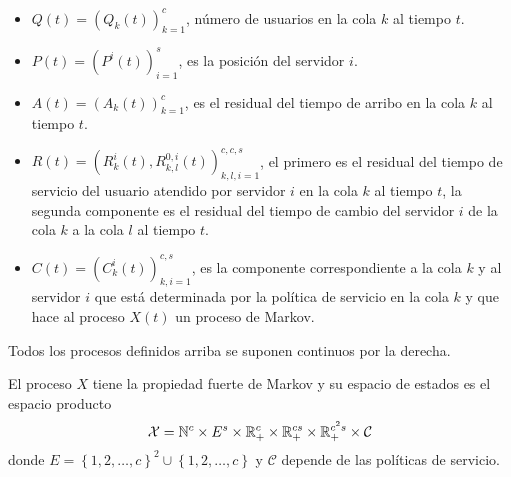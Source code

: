 \begin{itemize}
\item
$Q\left(t\right)=\left(Q_{k}\left(t\right)\right)_{k=1}^{c}$,
n\'umero de usuarios en la cola $k$ al tiempo $t$. \item
$P\left(t\right)=\left(P^{i}\left(t\right)\right)_{i=1}^{s}$, es
la posici\'on del servidor $i$. \item
$A\left(t\right)=\left(A_{k}\left(t\right)\right)_{k=1}^{c}$, es
el residual del tiempo de arribo en la cola $k$ al tiempo $t$.
\item
$R\left(t\right)=\left(R_{k}^{i}\left(t\right),R_{k,l}^{0,i}\left(t\right)\right)_{k,l,i=1}^{c,c,s}$,
el primero es el residual del tiempo de servicio del usuario
atendido por servidor $i$ en la cola $k$ al tiempo $t$, la segunda
componente es el residual del tiempo de cambio del servidor $i$ de
la cola $k$ a la cola $l$ al tiempo $t$. \item
$C\left(t\right)=\left(C_{k}^{i}\left(t\right)\right)_{k,i=1}^{c,s}$,
es la componente correspondiente a la cola $k$ y al servidor $i$
que est\'a determinada por la pol\'itica de servicio en la cola $k$
y que hace al proceso $X\left(t\right)$ un proceso de Markov.
\end{itemize}
Todos los procesos definidos arriba se suponen continuos por la
derecha.

El proceso $X$ tiene la propiedad fuerte de Markov y su espacio de
estados es el espacio producto
\[\mathcal{X}=\mathbb{N}^{c}\times E^{s}\times \mathbb{R}_{+}^{c}\times\mathbb{R}_{+}^{cs}\times\mathbb{R}_{+}^{c^{2}s}\times \mathcal{C}\] donde $E=\left\{1,2,\ldots,c\right\}^{2}\cup\left\{1,2,\ldots,c\right\}$ y $\mathcal{C}$  depende de las pol\'iticas de servicio.

%


